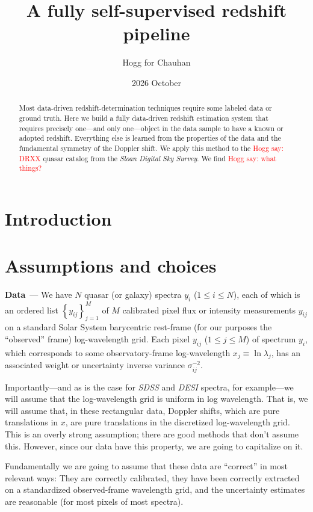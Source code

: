 \documentclass{article}
\title{\bfseries A fully self-supervised redshift pipeline}
\author{Hogg for Chauhan}
\date{2026 October}
\renewcommand{\paragraph}[1]{\par\medskip\noindent\textbf{#1}~---}
\newcommand{\setof}[1]{\left\{{#1}\right\}}
\newcommand{\hoggsay}[1]{{\textcolor{red}{Hogg say: {#1}}}}
\begin{document}
\maketitle

\begin{abstract}\noindent
    Most data-driven redshift-determination techniques require some labeled data or ground truth.
    Here we build a fully data-driven redshift estimation system that requires precisely one---and only one---object
    in the data sample to have a known or adopted redshift.
    Everything else is learned from the properties of the data and the fundamental symmetry of the Doppler shift.
    We apply this method to the \hoggsay{DRXX} quasar catalog from the \textsl{Sloan Digital Sky Survey}.
    We find \hoggsay{what things?}
\end{abstract}

\section{Introduction}

\section{Assumptions and choices}
\paragraph{Data}
We have $N$ quasar (or galaxy) spectra $y_i$ ($1\leq i\leq N$), each of which is an ordered list $\setof{y_{ij}}_{j=1}^M$ of $M$ calibrated pixel flux or intensity measurements $y_{ij}$ on a standard Solar System barycentric rest-frame (for our purposes the ``observed'' frame) log-wavelength grid.
Each pixel $y_{ij}$ ($1\leq j\leq M$) of spectrum $y_i$, which corresponds to some observatory-frame log-wavelength $x_j \equiv \ln\lambda_j$, has an associated weight or uncertainty inverse variance $\sigma^{-2}_{ij}$.

Importantly---and as is the case for \textsl{SDSS} and \textsl{DESI} spectra, for example---we will assume that the log-wavelength grid is uniform in log wavelength.
That is, we will assume that, in these rectangular data, Doppler shifts, which are pure translations in $x$, are pure translations in the discretized log-wavelength grid.
This is an overly strong assumption; there are good methods that don't assume this.
However, since our data have this property, we are going to capitalize on it.

Fundamentally we are going to assume that these data are ``correct'' in most relevant ways:
They are correctly calibrated, they have been correctly extracted on a standardized observed-frame wavelength grid, and the uncertainty estimates are reasonable (for most pixels of most spectra).
\end{document}
